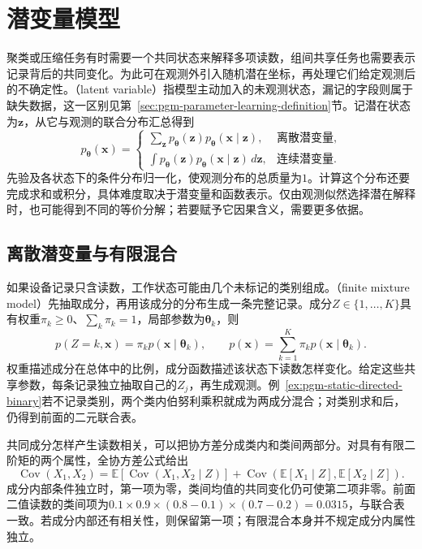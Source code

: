 \section{潜变量模型}
\label{sec:pgm-static-directed-latent}

聚类或压缩任务有时需要一个共同状态来解释多项读数，组间共享任务也需要表示记录背后的共同变化。为此可在观测外引入随机潜在坐标，再处理它们给定观测后的不确定性。（latent variable）指模型主动加入的未观测状态，漏记的字段则属于缺失数据，这一区别见第~\ref{sec:pgm-parameter-learning-definition}节。记潜在状态为$\bm z$，从它与观测的联合分布汇总得到
\begin{equation}
  \label{eq:pgm-static-directed-marginal}
  p_{\bm{\theta}}(\bm{x})=
  \begin{cases}
    \sum_{\bm{z}}p_{\bm{\theta}}(\bm{z})
          p_{\bm{\theta}}(\bm{x}\mid\bm{z}),
          &\text{离散潜变量},\\
    \int p_{\bm{\theta}}(\bm{z})
          p_{\bm{\theta}}(\bm{x}\mid\bm{z})\,d\bm{z},
          &\text{连续潜变量}.
  \end{cases}
\end{equation}
先验及各状态下的条件分布归一化，使观测分布的总质量为$1$。计算这个分布还要完成求和或积分，具体难度取决于潜变量和函数表示。仅由观测似然选择潜在解释时，也可能得到不同的等价分解；若要赋予它因果含义，需要更多依据。

\subsection{离散潜变量与有限混合}
\label{sec:pgm-static-directed-mixtures}

如果设备记录只含读数，工作状态可能由几个未标记的类别组成。（finite mixture model）先抽取成分，再用该成分的分布生成一条完整记录。成分$Z\in\{1,\ldots,K\}$具有权重$\pi_k\ge0$、$\sum_k\pi_k=1$，局部参数为$\bm\theta_k$，则
\begin{equation}
  \label{eq:pgm-static-directed-mixture}
  p(Z=k,\bm{x})=\pi_k p(\bm{x}\mid\bm{\theta}_k),
  \qquad
  p(\bm{x})=\sum_{k=1}^{K}\pi_kp(\bm{x}\mid\bm{\theta}_k).
\end{equation}
权重描述成分在总体中的比例，成分函数描述该状态下读数怎样变化。给定这些共享参数，每条记录独立抽取自己的$Z_j$，再生成观测。例~\ref{ex:pgm-static-directed-binary}若不记录类别，两个类内伯努利乘积就成为两成分混合；对类别求和后，仍得到前面的二元联合表。

共同成分怎样产生读数相关，可以把协方差分成类内和类间两部分。对具有有限二阶矩的两个属性，全协方差公式给出
\[
  \operatorname{Cov}(X_1,X_2)=
  \mathbb{E}\!\left[\operatorname{Cov}(X_1,X_2\mid Z)\right]
  +\operatorname{Cov}\!\left(
       \mathbb{E}[X_1\mid Z],\mathbb{E}[X_2\mid Z]\right).
\]
成分内部条件独立时，第一项为零，类间均值的共同变化仍可使第二项非零。前面二值读数的类间项为$0.1\times0.9\times(0.8-0.1)\times(0.7-0.2)=0.0315$，与联合表一致。若成分内部还有相关性，则保留第一项；有限混合本身并不规定成分内属性独立。

